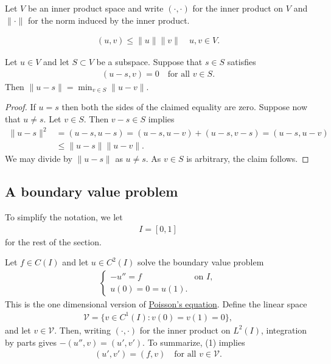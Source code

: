 \documentclass[12pt,oneside]{amsart}
\begin{document}
Let $V$ be an inner product space and write $(\cdot, \cdot)$ for the inner product on $V$ and $\|\cdot\|$ for the norm induced by the inner product.

\begin{lemma}
    \begin{align*}
(u, v) \le \|u\| \|v\| \quad u,v \in V.
    \end{align*}
\end{lemma}

\begin{lemma}
Let $u \in V$ and let $S \subset V$ be a subspace. Suppose that $s \in S$ satisfies
    \begin{align*}
(u - s, v) = 0 \quad \text{for all $v \in S$}.
    \end{align*}
Then $\| u - s \| = \min_{v \in S} \| u - v \|$.
\end{lemma}
\begin{proof}
If $u = s$ then both the sides of the claimed equality are zero.
Suppose now that $u \ne s$. Let $v \in S$. Then $v -s \in S$ implies
    \begin{align*}
\| u - s \|^2 
&= 
(u - s, u - s) 
= 
(u - s, u - v) + (u - s, v - s)
= 
(u - s, u - v) 
\\&\le 
\| u - s \| \| u - v \|.
    \end{align*}
We may divide by $\| u - s \|$ as $u \ne s$. As $v \in S$ is arbitrary, the claim follows.
\end{proof}

\subsection{A boundary value problem}

To simplify the notation, we let
    \begin{align*}
I = [0,1]
    \end{align*}
for the rest of the section.

Let $f \in C(I)$ and let $u \in C^2(I)$ solve the boundary value problem 
\begin{align}\label{eq_poisson_1d}
\begin{cases}
-u'' = f & \text{on $I$},
\\
u(0) = 0 = u(1).
\end{cases}\end{align}
This is the one dimensional version of \href{https://en.wikipedia.org/wiki/Poisson's_equation}{Poisson's equation}. Define the linear space
    \begin{align}\label{def_wrong_V}
\mathcal V = \{ v \in C^1(I) : v(0) = v(1) = 0 \},
    \end{align}
and let $v \in \mathcal V$. Then, writing $(\cdot, \cdot)$ for the inner product on $L^2(I)$, integration by parts gives $-(u'', v) = (u', v')$. To summarize, (1) implies
\begin{align}\label{eq_weak_prelim}
(u', v') = (f, v) \quad \text{for all $v \in \mathcal V$}. 
\end{align}
\end{document}

